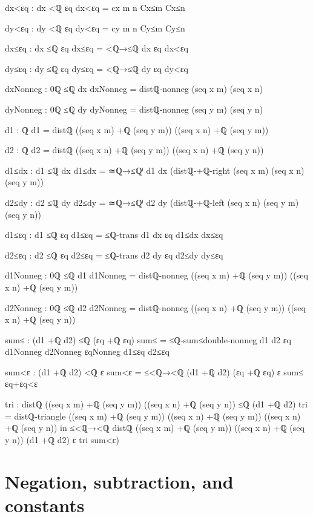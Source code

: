 \documentclass[11pt,a4paper]{book}
\begin{document}
\begin{code}
{          dx<εq : dx <ℚ εq
          dx<εq = cx m n Cx≤m Cx≤n

          dy<εq : dy <ℚ εq
          dy<εq = cy m n Cy≤m Cy≤n

          dx≤εq : dx ≤ℚ εq
          dx≤εq = <ℚ→≤ℚ {dx} {εq} dx<εq

          dy≤εq : dy ≤ℚ εq
          dy≤εq = <ℚ→≤ℚ {dy} {εq} dy<εq

          dxNonneg : 0ℚ ≤ℚ dx
          dxNonneg = distℚ-nonneg (seq x m) (seq x n)

          dyNonneg : 0ℚ ≤ℚ dy
          dyNonneg = distℚ-nonneg (seq y m) (seq y n)

          d1 : ℚ
          d1 = distℚ ((seq x m) +ℚ (seq y m)) ((seq x n) +ℚ (seq y m))

          d2 : ℚ
          d2 = distℚ ((seq x n) +ℚ (seq y m)) ((seq x n) +ℚ (seq y n))

          d1≤dx : d1 ≤ℚ dx
          d1≤dx = ≃ℚ→≤ℚˡ {d1} {dx} (distℚ-+ℚ-right (seq x m) (seq x n) (seq y m))

          d2≤dy : d2 ≤ℚ dy
          d2≤dy = ≃ℚ→≤ℚˡ {d2} {dy} (distℚ-+ℚ-left (seq x n) (seq y m) (seq y n))

          d1≤εq : d1 ≤ℚ εq
          d1≤εq = ≤ℚ-trans {d1} {dx} {εq} d1≤dx dx≤εq

          d2≤εq : d2 ≤ℚ εq
          d2≤εq = ≤ℚ-trans {d2} {dy} {εq} d2≤dy dy≤εq

          d1Nonneg : 0ℚ ≤ℚ d1
          d1Nonneg = distℚ-nonneg ((seq x m) +ℚ (seq y m)) ((seq x n) +ℚ (seq y m))

          d2Nonneg : 0ℚ ≤ℚ d2
          d2Nonneg = distℚ-nonneg ((seq x n) +ℚ (seq y m)) ((seq x n) +ℚ (seq y n))

          sum≤ : (d1 +ℚ d2) ≤ℚ (εq +ℚ εq)
          sum≤ = ≤ℚ-sum≤double-nonneg d1 d2 εq d1Nonneg d2Nonneg εqNonneg d1≤εq d2≤εq

          sum<ε : (d1 +ℚ d2) <ℚ ε
          sum<ε = ≤<ℚ→<ℚ {(d1 +ℚ d2)} {(εq +ℚ εq)} {ε} sum≤ εq+εq<ε

          tri : distℚ ((seq x m) +ℚ (seq y m)) ((seq x n) +ℚ (seq y n)) ≤ℚ (d1 +ℚ d2)
          tri = distℚ-triangle ((seq x m) +ℚ (seq y m)) ((seq x n) +ℚ (seq y m)) ((seq x n) +ℚ (seq y n))
        in
        ≤<ℚ→<ℚ {distℚ ((seq x m) +ℚ (seq y m)) ((seq x n) +ℚ (seq y n))} {(d1 +ℚ d2)} {ε} tri sum<ε)
  }
\end{code}


\section{Negation, subtraction, and constants}
\end{document}
